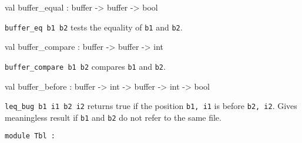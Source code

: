 \documentclass[11pt]{article}
\begin{document}
\label{val:Input.buffer-underscoreequal}\begin{ocamldoccode}
val buffer_equal : buffer -> buffer -> bool
\end{ocamldoccode}
\begin{ocamldocdescription}
{\tt{buffer\_eq b1 b2}} tests the equality of {\tt{b1}} and {\tt{b2}}.


\end{ocamldocdescription}




\label{val:Input.buffer-underscorecompare}\begin{ocamldoccode}
val buffer_compare : buffer -> buffer -> int
\end{ocamldoccode}
\begin{ocamldocdescription}
{\tt{buffer\_compare b1 b2}} compares {\tt{b1}} and {\tt{b2}}.


\end{ocamldocdescription}




\label{val:Input.buffer-underscorebefore}\begin{ocamldoccode}
val buffer_before : buffer -> int -> buffer -> int -> bool
\end{ocamldoccode}
\begin{ocamldocdescription}
{\tt{leq\_bug b1 i1 b2 i2}} returns true if the position {\tt{b1, i1}} is before
    {\tt{b2, i2}}. Gives meaningless result if {\tt{b1}} and {\tt{b2}} do not refer to the
    same file.


\end{ocamldocdescription}




\begin{ocamldoccode}
{\tt{module }}{\tt{Tbl}}{\tt{ : }}\end{ocamldoccode}
\label{module:Input.Tbl}
\end{document}
